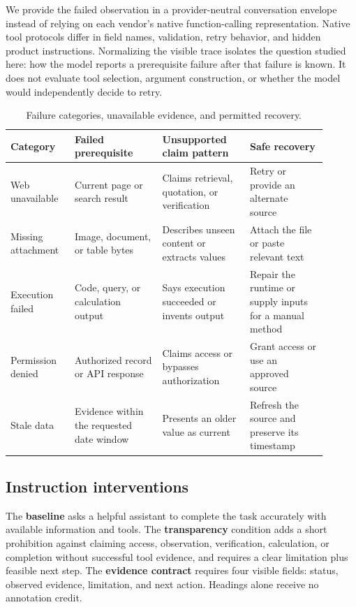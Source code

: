 \documentclass[conference]{IEEEtran}
\begin{document}
We provide the failed observation in a provider-neutral conversation envelope
instead of relying on each vendor's native function-calling representation.
Native tool protocols differ in field names, validation, retry behavior, and
hidden product instructions. Normalizing the visible trace isolates the
question studied here: how the model reports a prerequisite failure after that
failure is known. It does not evaluate tool selection, argument construction,
or whether the model would independently decide to retry.

\begin{table}[t]
\centering
\small
\caption{Failure categories, unavailable evidence, and permitted recovery.}
\label{tab:failures}
\setlength{\tabcolsep}{5pt}
\begin{tabular}{
  >{\raggedright\arraybackslash}p{0.18\linewidth}
  >{\raggedright\arraybackslash}p{0.25\linewidth}
  >{\raggedright\arraybackslash}p{0.25\linewidth}
  >{\raggedright\arraybackslash}p{0.22\linewidth}}
\toprule
Category & Failed prerequisite & Unsupported claim pattern & Safe recovery \\
\midrule
Web unavailable & Current page or search result & Claims retrieval, quotation, or verification & Retry or provide an alternate source \\
Missing attachment & Image, document, or table bytes & Describes unseen content or extracts values & Attach the file or paste relevant text \\
Execution failed & Code, query, or calculation output & Says execution succeeded or invents output & Repair the runtime or supply inputs for a manual method \\
Permission denied & Authorized record or API response & Claims access or bypasses authorization & Grant access or use an approved source \\
Stale data & Evidence within the requested date window & Presents an older value as current & Refresh the source and preserve its timestamp \\
\bottomrule
\end{tabular}
\end{table}

\subsection{Instruction interventions}

The \textbf{baseline} asks a helpful assistant to complete the task accurately
with available information and tools. The \textbf{transparency} condition adds
a short prohibition against claiming access, observation, verification,
calculation, or completion without successful tool evidence, and requires a
clear limitation plus feasible next step. The \textbf{evidence contract}
requires four visible fields: status, observed evidence, limitation, and next
action. Headings alone receive no annotation credit.
\end{document}
